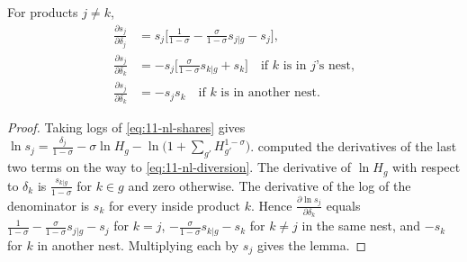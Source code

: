 \begin{lemma}\label{lem:11-nl-deriv}
For products $j\neq k$,
\begin{align*}
\frac{\partial s_j}{\partial\delta_j}&=s_j\Big[\frac{1}{1-\sigma}-\frac{\sigma}{1-\sigma}s_{j|g}-s_j\Big],\\
\frac{\partial s_j}{\partial\delta_k}&=-s_j\Big[\frac{\sigma}{1-\sigma}s_{k|g}+s_k\Big]\quad\text{if $k$ is in $j$'s nest,}\\
\frac{\partial s_j}{\partial\delta_k}&=-s_js_k\quad\text{if $k$ is in another nest.}
\end{align*}
\end{lemma}

\begin{proof}
Taking logs of \eqref{eq:11-nl-shares} gives
$\ln s_j=\frac{\delta_j}{1-\sigma}-\sigma\ln H_g-\ln\big(1+\sum_{g'}H_{g'}^{1-\sigma}\big)$. 
computed the derivatives of the last two terms on the way to \eqref{eq:11-nl-diversion}. The derivative of $\ln H_g$
with respect to $\delta_k$ is $\frac{s_{k|g}}{1-\sigma}$ for $k\in g$ and zero otherwise. The derivative of the log
of the denominator is $s_k$ for every inside product $k$. Hence $\frac{\partial\ln s_j}{\partial\delta_k}$ equals
$\frac{1}{1-\sigma}-\frac{\sigma}{1-\sigma}s_{j|g}-s_j$ for $k=j$, $-\frac{\sigma}{1-\sigma}s_{k|g}-s_k$ for $k\neq j$
in the same nest, and $-s_k$ for $k$ in another nest. Multiplying each by $s_j$ gives the lemma.
\end{proof}

